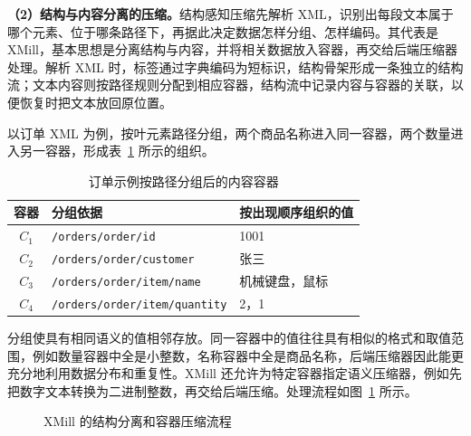 \textbf{（2）结构与内容分离的压缩。}结构感知压缩先解析 XML，识别出每段文本属于哪个元素、位于哪条路径下，再据此决定数据怎样分组、怎样编码。其代表是 XMill，基本思想是分离结构与内容，并将相关数据放入容器，再交给后端压缩器处理\cite{liefke2000xmill}。解析 XML 时，标签通过字典编码为短标识，结构骨架形成一条独立的结构流；文本内容则按路径规则分配到相应容器，结构流中记录内容与容器的关联，以便恢复时把文本放回原位置。

以订单 XML 为例，按叶元素路径分组，两个商品名称进入同一容器，两个数量进入另一容器，形成表~\ref{tab:foundation-containers} 所示的组织。

\begin{table}[htbp]
\centering
\caption{订单示例按路径分组后的内容容器}
\label{tab:foundation-containers}
\begin{tabular}{cll}
\toprule
容器 & 分组依据 & 按出现顺序组织的值 \\
\midrule
$C_1$ & \texttt{/orders/order/id} & 1001 \\
$C_2$ & \texttt{/orders/order/customer} & 张三 \\
$C_3$ & \texttt{/orders/order/item/name} & 机械键盘，鼠标 \\
$C_4$ & \texttt{/orders/order/item/quantity} & 2，1 \\
\bottomrule
\end{tabular}
\end{table}

分组使具有相同语义的值相邻存放。同一容器中的值往往具有相似的格式和取值范围，例如数量容器中全是小整数，名称容器中全是商品名称，后端压缩器因此能更充分地利用数据分布和重复性。XMill 还允许为特定容器指定语义压缩器，例如先把数字文本转换为二进制整数，再交给后端压缩\cite{liefke2000xmill}。处理流程如图~\ref{fig:foundation-xmill} 所示。

\begin{figure}[htbp]
\centering
{}
\caption{XMill 的结构分离和容器压缩流程}
\label{fig:foundation-xmill}
\end{figure}


